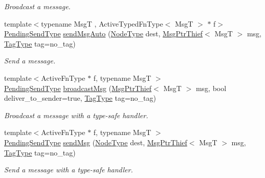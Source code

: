\begin{DoxyCompactItemize}
\begin{DoxyCompactList}\small\item\em Broadcast a message. \end{DoxyCompactList}\item 
{\footnotesize template$<$typename MsgT , Active\+Typed\+Fn\+Type$<$ Msg\+T $>$ $\ast$ f$>$ }\\\hyperlink{structvt_1_1messaging_1_1_active_messenger_a3626a6ca76d8ad4ec7c3b47a2c70d3a8}{Pending\+Send\+Type} \hyperlink{group__typesafehan_ga9e67738f189123c256172ce9e22a8b68}{send\+Msg\+Auto} (\hyperlink{namespacevt_a866da9d0efc19c0a1ce79e9e492f47e2}{Node\+Type} dest, \hyperlink{structvt_1_1messaging_1_1_msg_ptr_thief}{Msg\+Ptr\+Thief}$<$ MsgT $>$ msg, \hyperlink{namespacevt_a84ab281dae04a52a4b243d6bf62d0e52}{Tag\+Type} tag=no\+\_\+tag)
\begin{DoxyCompactList}\small\item\em Send a message. \end{DoxyCompactList}\item 
{\footnotesize template$<$Active\+Fn\+Type $\ast$ f, typename MsgT $>$ }\\\hyperlink{structvt_1_1messaging_1_1_active_messenger_a3626a6ca76d8ad4ec7c3b47a2c70d3a8}{Pending\+Send\+Type} \hyperlink{group__basicsend_ga880e93f0c239c1aa9c9ade805d75dd7a}{broadcast\+Msg} (\hyperlink{structvt_1_1messaging_1_1_msg_ptr_thief}{Msg\+Ptr\+Thief}$<$ MsgT $>$ msg, bool deliver\+\_\+to\+\_\+sender=true, \hyperlink{namespacevt_a84ab281dae04a52a4b243d6bf62d0e52}{Tag\+Type} tag=no\+\_\+tag)
\begin{DoxyCompactList}\small\item\em Broadcast a message with a type-\/safe handler. \end{DoxyCompactList}\item 
{\footnotesize template$<$Active\+Fn\+Type $\ast$ f, typename MsgT $>$ }\\\hyperlink{structvt_1_1messaging_1_1_active_messenger_a3626a6ca76d8ad4ec7c3b47a2c70d3a8}{Pending\+Send\+Type} \hyperlink{group__basicsend_gaab0dc380a72f038f4fc2350ba89de98f}{send\+Msg} (\hyperlink{namespacevt_a866da9d0efc19c0a1ce79e9e492f47e2}{Node\+Type} dest, \hyperlink{structvt_1_1messaging_1_1_msg_ptr_thief}{Msg\+Ptr\+Thief}$<$ MsgT $>$ msg, \hyperlink{namespacevt_a84ab281dae04a52a4b243d6bf62d0e52}{Tag\+Type} tag=no\+\_\+tag)
\begin{DoxyCompactList}\small\item\em Send a message with a type-\/safe handler. \end{DoxyCompactList}\item 

\end{DoxyCompactItemize}
